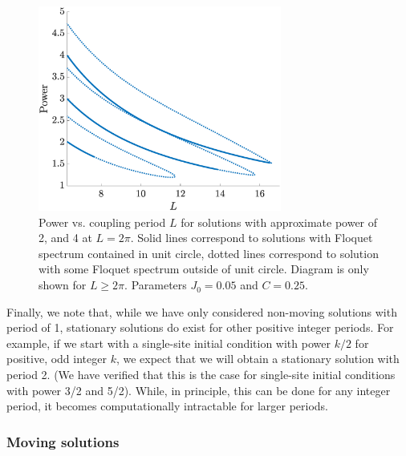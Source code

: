 \documentclass[reprint, amsmath,amssymb,aps,pre]{revtex4-2}
\begin{document}
\begin{figure}
    \centering
    \includegraphics[width=8cm]{stat234contL.eps}
    \caption{Power vs. coupling period $L$ for solutions with approximate power of 2, and 4 at $L = 2\pi$. Solid lines correspond to solutions with Floquet spectrum contained in unit circle, dotted lines correspond to solution with some Floquet spectrum outside of unit circle. Diagram is only shown for $L\geq 2\pi$. Parameters $J_0 = 0.05$ and $C=0.25$.}
    \label{fig:statcontL}
\end{figure}

Finally, we note that, while we have only considered non-moving solutions with period of 1, stationary solutions do exist for other positive integer periods. For example, if we start with a single-site initial condition with power $k/2$ for positive, odd integer $k$, we expect that we will obtain a stationary solution with period 2. (We have verified that this is the case for single-site initial conditions with power 3/2 and 5/2). While, in principle, this can be done for any integer period, it becomes computationally intractable for larger periods.

\subsubsection{Moving solutions}\label{sec:movingsol}
\end{document}
